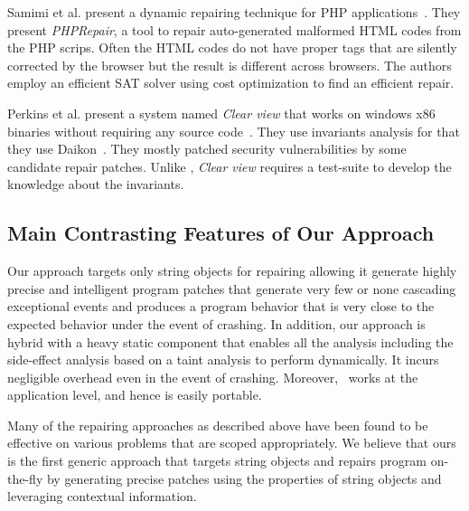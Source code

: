  Samimi et al. present a dynamic repairing
technique for PHP applications~\cite{SamirniSAMTH12}. They present
\textit{PHPRepair}, a tool to repair auto-generated malformed HTML codes from
the PHP scrips. Often the HTML codes do not have proper tags that are silently
corrected by the browser but the result is different across browsers. The
authors employ an efficient SAT solver using cost optimization to find an
efficient repair.

 Perkins et al. present a system named
\emph{Clear view} that works on windows x86 binaries without requiring any
source code~\cite{conf/sosp/PerkinsKLABCPSSSWZER09}. They use invariants
analysis for that they use Daikon~\cite{DBLP:journals/scp/ErnstPGMPTX07}. They
mostly patched security vulnerabilities by some candidate repair patches. Unlike
\tool, \emph{Clear view} requires a test-suite to develop the knowledge about
the invariants.

\subsection{Main Contrasting Features of Our Approach}

Our approach targets only string objects for repairing allowing it generate
highly precise and intelligent program patches that generate very few or none
cascading exceptional events and produces a program behavior that is very close
to the expected behavior under the event of crashing. In addition, our approach
is hybrid with a heavy static component that enables all the analysis including
the side-effect analysis based on a taint analysis to perform dynamically. It
incurs negligible overhead even in the event of crashing. Moreover, \tool\ works
at the application level, and hence is easily portable.

Many of the repairing approaches as described above have been found to be
effective on various problems that are scoped appropriately. We believe that
ours is the first generic approach that targets string objects and repairs
program on-the-fly by generating precise patches using the properties of string
objects and leveraging contextual information.
